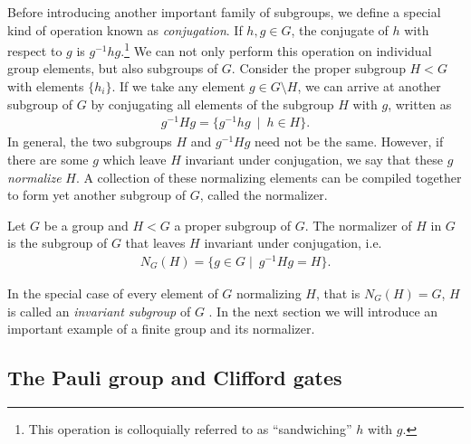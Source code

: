 Before introducing another important family of subgroups, we define a special
kind of operation known as \emph{conjugation}. If $h,g\in G$, the conjugate of
$h$ with respect to $g$ is $g^{-1} h g$.\footnote{This operation is
colloquially referred to as \enquote{sandwiching} $h$ with $g$.}
We can not only perform this operation on individual group elements, but also
subgroups of $G$. 
Consider the proper subgroup $H<G$ with elements $\{h_i\}$. 
If we take any element $g \in G
\setminus H$, we can arrive at another subgroup of $G$ by conjugating all
elements of the
subgroup $H$ with $g$, written as
\begin{align}
  g^{-1}Hg = \{ g^{-1} h g \ \mid \ h \in H \}
.\end{align}
In general, the two subgroups $H$ and $g^{-1}Hg$ need not be the same. However,
if there are some $g$ which leave $H$ invariant under conjugation, we say that
these $g$ \emph{normalize} $H$. A collection of these normalizing elements can
be compiled together to form yet another subgroup of $G$, called the
normalizer.
\begin{defn}\label{defn:normalizer}
  Let $G$ be a group and $H < G$ a proper subgroup of $G$. The normalizer of
  $H$ in $G$ is the subgroup of $G$ that leaves $H$ invariant under
  conjugation, i.e.
  \begin{align}
    N_G(H) = \{ g \in G \mid \ g^{-1} H g = H \}
  .\end{align}
\end{defn}
In the special case of every element of $G$ normalizing $H$, that is $N_G(H) =
G$, $H$ is called an \emph{invariant subgroup} of $G$
\cite{zeeGroupTheoryNutshell2016}. In the next section we
will introduce an important example of a finite group and its normalizer. 
\subsection{The Pauli group and Clifford gates}

